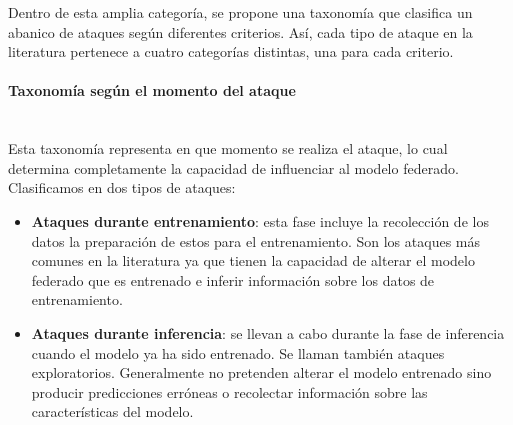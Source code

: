 Dentro de esta amplia categoría, se propone una taxonomía que clasifica un abanico de ataques según diferentes criterios. Así, cada tipo de ataque en la literatura pertenece a cuatro categorías distintas, una para cada criterio.

\paragraph{Taxonomía según el momento del ataque}\mbox{}\\
Esta taxonomía representa en que momento se realiza el ataque, lo cual determina completamente la capacidad de influenciar al modelo federado. Clasificamos en dos tipos de ataques:
\begin{itemize}
    \item \textbf{Ataques durante entrenamiento}: esta fase incluye la recolección de los datos la preparación de estos para el entrenamiento. Son los ataques más comunes en la literatura ya que tienen la capacidad de alterar el modelo federado que es entrenado e inferir información sobre los datos de entrenamiento.
    \item \textbf{Ataques durante inferencia}: se llevan a cabo durante la fase de inferencia cuando el modelo ya ha sido entrenado. Se llaman también ataques exploratorios. Generalmente no pretenden alterar el modelo entrenado sino producir predicciones erróneas o recolectar información sobre las características del modelo.
\end{itemize}

